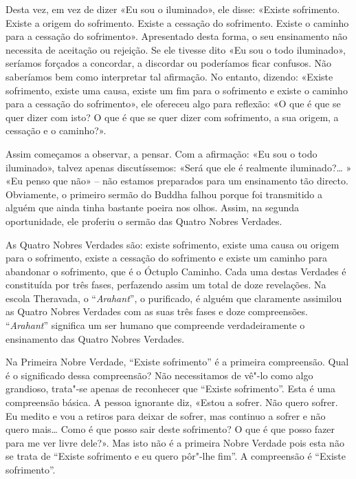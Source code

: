 Desta vez, em vez de dizer «Eu sou o iluminado», ele disse: «Existe sofrimento.
Existe a origem do sofrimento. Existe a cessação do sofrimento. Existe o caminho
para a cessação do sofrimento». Apresentado desta forma, o seu ensinamento não
necessita de aceitação ou rejeição. Se ele tivesse dito «Eu sou o todo
iluminado», seríamos forçados a concordar, a discordar ou poderíamos ficar confusos.
Não saberíamos bem como interpretar tal afirmação. No entanto, dizendo: «Existe
sofrimento, existe uma causa, existe um fim para o sofrimento e existe o caminho
para a cessação do sofrimento», ele ofereceu algo para reflexão: «O que é que se
quer dizer com isto? O que é que se quer dizer com sofrimento, a sua origem, a
cessação e o caminho?».

\enlargethispage{\baselineskip}

Assim começamos a observar, a pensar. Com a afirmação: «Eu sou o todo
iluminado», talvez apenas discutíssemos: «Será que ele é realmente
iluminado?\ldots{} » «Eu penso que não» – não estamos preparados para um ensinamento
tão directo. Obviamente, o primeiro sermão do Buddha falhou porque foi
transmitido a alguém que ainda tinha bastante poeira nos olhos. Assim, na
segunda oportunidade, ele proferiu o sermão das Quatro Nobres Verdades.

\sectionBreak

As Quatro Nobres Verdades são: existe sofrimento, existe uma causa ou origem
para o sofrimento, existe a cessação do sofrimento e existe um caminho para
abandonar o sofrimento, que é o Óctuplo Caminho. Cada uma destas Verdades é
constituída por três fases, perfazendo assim um total de doze revelações. Na
escola Theravada, o “\emph{Arahant}”, o purificado, é alguém que claramente
assimilou as Quatro Nobres Verdades com as suas três fases e doze compreensões.
“\emph{Arahant}” significa um ser humano que compreende verdadeiramente o
ensinamento das Quatro Nobres Verdades.

Na Primeira Nobre Verdade, “Existe sofrimento” é a primeira compreensão. Qual é o
significado dessa compreensão? Não necessitamos de vê"-lo como algo grandioso,
trata"-se apenas de reconhecer que “Existe sofrimento”. Esta é uma compreensão
básica. A pessoa ignorante diz, «Estou a sofrer. Não quero sofrer. Eu medito e
vou a retiros para deixar de sofrer, mas continuo a sofrer e não quero
mais\ldots{} Como é que posso sair deste sofrimento? O que é que posso fazer
para me ver livre dele?». Mas isto não é a primeira Nobre Verdade pois esta não
se trata de “Existe sofrimento e eu quero pôr"-lhe fim”. A compreensão é “Existe
sofrimento”.

